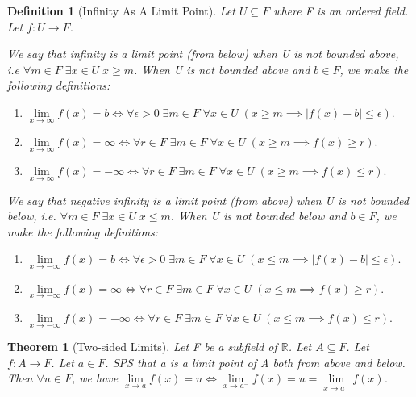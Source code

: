 \documentclass[11pt, oneside]{book}
\theoremstyle{break}
\newtheorem{thm}{Theorem}[section]
\newtheorem{defn}{Definition}[section]
\newcommand{\bb}[1]{\mathbb{#1}}			%
\begin{document}
\begin{defn}[Infinity As A Limit Point]
	Let $U \subseteq F$ where F is an ordered field. Let $f: U \to F$.

	We say that infinity is a limit point (from below) when U is not bounded above, i.e $\forall m \in F \; \exists x \in U \; x \geq m$. When U is not bounded above and $b \in F$, we make the following definitions:
	\begin{enumerate}
		\item $\lim\limits_{x \to \infty} f(x) = b \iff \forall \epsilon > 0 \; \exists m \in F \; \forall x \in U \; (x \geq m \implies |f(x) - b| \leq \epsilon).$
		\item $\lim\limits_{x \to \infty} f(x) = \infty \iff \forall r \in F \; \exists m \in F \; \forall x \in U \; (x \geq m \implies f(x) \geq r).$
		\item $\lim\limits_{x \to \infty} f(x) = -\infty \iff \forall r \in F \; \exists m \in F \; \forall x \in U \; (x \geq m \implies f(x) \leq r).$
	\end{enumerate}

	We say that negative infinity is a limit point (from above) when U is not bounded below, i.e. $\forall m \in F \; \exists x \in U \; x \leq m$. When U is not bounded below and $b \in F$, we make the following definitions:
	\begin{enumerate}
		\item $\lim\limits_{x \to -\infty} f(x) = b \iff \forall \epsilon > 0 \; \exists m \in F \; \forall x \in U \; (x \leq m \implies |f(x) - b| \leq \epsilon).$
		\item $\lim\limits_{x \to -\infty} f(x) = \infty \iff \forall r \in F \; \exists m \in F \; \forall x \in U \; (x \leq m \implies f(x) \geq r).$
		\item $\lim\limits_{x \to -\infty} f(x) = -\infty \iff \forall r \in F \; \exists m \in F \; \forall x \in U \; (x \leq m \implies f(x) \leq r).$
	\end{enumerate}
\end{defn}

\begin{thm}[Two-sided Limits]
	Let F be a subfield of $\bb{R}$. Let $A \subseteq F$. Let $f: A \to F$. Let $a \in F$. SPS that a is a limit point of A both from above and below. Then $\forall u \in F$, we have $\lim\limits_{x \to a} f(x) = u \iff \lim\limits_{x \to a^-} f(x) = u = \lim\limits_{x \to a^+} f(x)$.
\end{thm}
\end{document}
